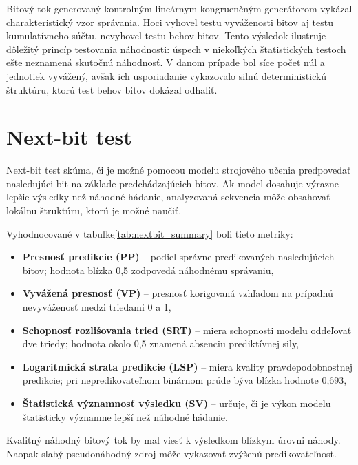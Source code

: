 Bitový tok generovaný kontrolným lineárnym kongruenčným generátorom vykázal charakteristický vzor správania.
Hoci vyhovel testu vyváženosti bitov aj testu kumulatívneho súčtu, nevyhovel testu behov bitov.
Tento výsledok ilustruje dôležitý princíp testovania náhodnosti: úspech v niekoľkých štatistických testoch ešte neznamená skutočnú náhodnosť.
V danom prípade bol síce počet núl a jednotiek vyvážený, avšak ich usporiadanie vykazovalo silnú deterministickú štruktúru, ktorú test behov bitov dokázal odhaliť.










\section{Next-bit test}


Next-bit test skúma, či je možné pomocou modelu strojového učenia predpovedať nasledujúci bit na základe predchádzajúcich bitov.
Ak model dosahuje výrazne lepšie výsledky než náhodné hádanie, analyzovaná sekvencia môže obsahovať lokálnu štruktúru, ktorú je možné naučiť.

Vyhodnocované v tabuľke\ref{tab:nextbit_summary} boli tieto metriky:
\begin{itemize}
  \item \textbf{Presnosť predikcie (PP)} -- podiel správne predikovaných nasledujúcich bitov; hodnota blízka 0,5 zodpovedá náhodnému správaniu,

  \item \textbf{Vyvážená presnosť (VP)} -- presnosť korigovaná vzhľadom na prípadnú nevyváženosť medzi triedami 0 a 1,

  \item \textbf{Schopnosť rozlišovania tried (SRT)} -- miera schopnosti modelu oddeľovať dve triedy; hodnota okolo 0,5 znamená absenciu prediktívnej sily,

  \item \textbf{Logaritmická strata predikcie (LSP)} -- miera kvality pravdepodobnostnej predikcie; pri nepredikovateľnom binárnom prúde býva blízka hodnote 0,693,

  \item \textbf{Štatistická významnosť výsledku (SV)} -- určuje, či je výkon modelu štatisticky významne lepší než náhodné hádanie.
\end{itemize}

Kvalitný náhodný bitový tok by mal viesť k výsledkom blízkym úrovni náhody.
Naopak slabý pseudonáhodný zdroj môže vykazovať zvýšenú predikovateľnosť.


